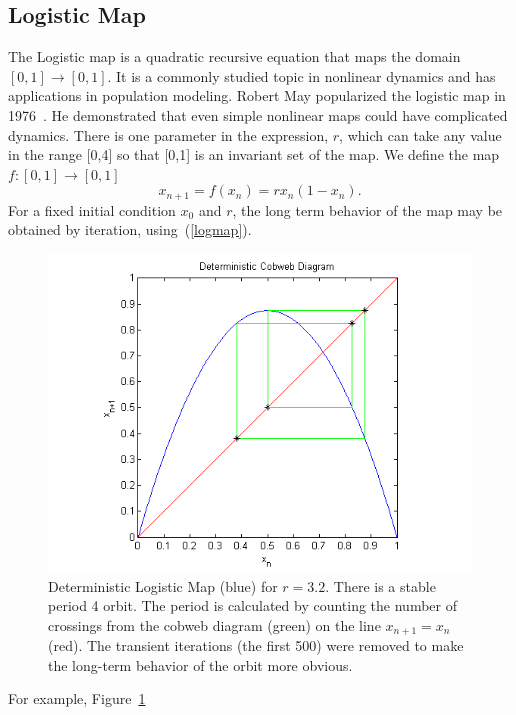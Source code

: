 \subsection{Logistic Map}
The Logistic map is a quadratic recursive equation that maps the domain
$[0,1] \rightarrow [0,1]$. It is a commonly studied topic in nonlinear dynamics and has
applications in population modeling. Robert May popularized the
logistic map in 1976~\cite{may}. He demonstrated that even simple nonlinear
maps could have complicated dynamics. There is one parameter in the
expression, $r$, which can take any value in the range [0,4] so that
[0,1] is an invariant set of the map. We define the map $f:[0,1]\to [0,1]$
\begin{equation}\label{logmap}
x_{n+1} = f(x_n) = rx_n(1-x_n).
\end{equation}
For a fixed initial condition $x_0$ and $r$, the long term behavior of
the map may be obtained by iteration, using~(\ref{logmap}). 
\begin{figure}[!h]
\caption[Deterministic logistic map, stable orbit]{Deterministic Logistic Map (blue) for $r=3.2$. There is a stable period
4 orbit. The period is calculated by counting the number
of crossings from the cobweb diagram (green) on the line $x_{n+1}=x_n$
(red). The transient iterations (the first 500) were removed to make
the long-term behavior of the orbit more obvious.}\label{fig:detlogstable}
    \begin{center}
	\includegraphics[scale=0.8]{figs/det_cobweb.png}
    \end{center}
\end{figure}
For example, Figure~\ref{fig:detlogstable}
